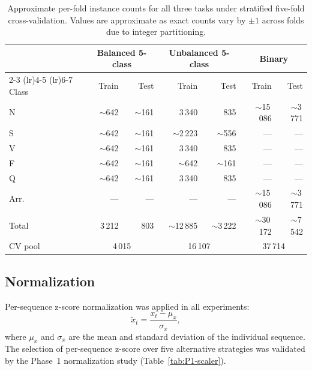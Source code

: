 \documentclass[journal=asbcd6,manuscript=suppinfo]{achemso}
\begin{document}
\begin{table}[H]
    \centering
    \caption{Approximate per-fold instance counts for all three tasks under stratified five-fold cross-validation. 
    Values are approximate as exact counts vary by $\pm 1$ across folds due to integer partitioning.}
    \label{tab:per-class-pipeline}\footnotesize %
    \begin{tabular}{l rr rr rr} %
        \toprule
        & \multicolumn{2}{c}{Balanced 5-class} & \multicolumn{2}{c}{Unbalanced 5-class} & \multicolumn{2}{c}{Binary} \\
        \cmidrule(lr){2-3} \cmidrule(lr){4-5} \cmidrule(lr){6-7}
        Class & Train & Test & Train & Test & Train & Test \\
        \midrule
        N & ${\sim}$642 & ${\sim}$161 & 3\,340 & 835 & ${\sim}$15\,086 & ${\sim}$3\,771 \\
        S & ${\sim}$642 & ${\sim}$161 & ${\sim}$2\,223 & ${\sim}$556 & --- & --- \\
        V & ${\sim}$642 & ${\sim}$161 & 3\,340 & 835 & --- & --- \\
        F & ${\sim}$642 & ${\sim}$161 & ${\sim}$642 & ${\sim}$161 & --- & --- \\
        Q & ${\sim}$642 & ${\sim}$161 & 3\,340 & 835 & --- & --- \\
        Arr. & --- & --- & --- & --- & ${\sim}$15\,086 & ${\sim}$3\,771 \\
        \midrule
        Total & 3\,212 & 803 & ${\sim}$12\,885 & ${\sim}$3\,222 & ${\sim}$30\,172 & ${\sim}$7\,542 \\
        CV pool & \multicolumn{2}{c}{4\,015} & \multicolumn{2}{c}{16\,107} & \multicolumn{2}{c}{37\,714} \\
        \bottomrule
    \end{tabular}
\end{table}

\subsection{Normalization}

Per-sequence z-score normalization was applied in all experiments:
\begin{equation}
    \tilde{x}_t = \frac{x_t - \mu_x}{\sigma_x},
\end{equation}
where $\mu_x$ and $\sigma_x$ are the mean and standard deviation of the individual sequence. 
The selection of per-sequence z-score over five alternative strategies was validated by the Phase~1 normalization study (Table~\ref{tab:P1-scaler}).
\end{document}
